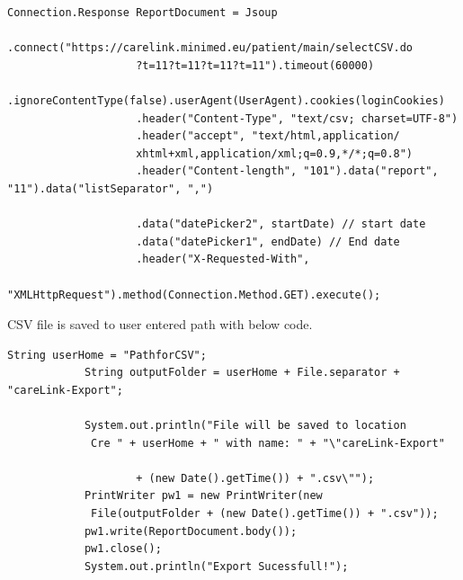 \documentclass[article,type=msc,colorback,accentcolor=tud9c,twoside,11pt]{tudthesis}
\begin{document}
\begin{lstlisting}
Connection.Response ReportDocument = Jsoup
					.connect("https://carelink.minimed.eu/patient/main/selectCSV.do
					?t=11?t=11?t=11?t=11").timeout(60000)
					.ignoreContentType(false).userAgent(UserAgent).cookies(loginCookies)
					.header("Content-Type", "text/csv; charset=UTF-8")
					.header("accept", "text/html,application/
					xhtml+xml,application/xml;q=0.9,*/*;q=0.8")
					.header("Content-length", "101").data("report", "11").data("listSeparator", ",")
					
					.data("datePicker2", startDate) // start date
					.data("datePicker1", endDate) // End date
					.header("X-Requested-With",
					 "XMLHttpRequest").method(Connection.Method.GET).execute();
\end{lstlisting}
CSV file is saved to user entered path with below code.
\begin{lstlisting}
String userHome = "PathforCSV";
			String outputFolder = userHome + File.separator + "careLink-Export";
			
			System.out.println("File will be saved to location
			 Cre " + userHome + " with name: " + "\"careLink-Export"
			
					+ (new Date().getTime()) + ".csv\"");
			PrintWriter pw1 = new PrintWriter(new
			 File(outputFolder + (new Date().getTime()) + ".csv"));
			pw1.write(ReportDocument.body());
			pw1.close();
			System.out.println("Export Sucessfull!");
\end{lstlisting}
\end{document}
